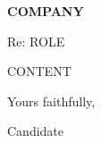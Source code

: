 \documentclass[11pt]{article}
\begin{document}
\textbf{ {{COMPANY}} }

Re: {{ROLE}}

{{CONTENT}}

Yours faithfully,

Candidate
\end{document}
